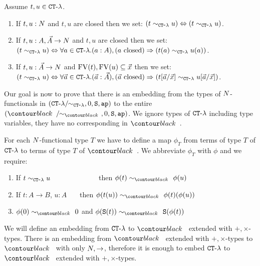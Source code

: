 \begin{definition}
Assume $t,u \in { {\tt CT} \mbox{-} \lambda}$.
\begin{enumerate}
\item
If $t,u:{N}$ and $t,u$ are closed then we set: 
$(t \sim_{{ {\tt CT} \mbox{-} \lambda}} u) \Leftrightarrow  (t \sim_{{ {\tt CT} \mbox{-} \lambda}} u)$.
\item
If $t,u:A,\vec{A}\rightarrow{N}$ and $t,u$ are closed then we set: 
$(t \sim_{{ {\tt CT} \mbox{-} \lambda}} u) \Leftrightarrow  
\forall a \in { {\tt CT} \mbox{-} \lambda}. (a:A), (\mbox{$a$ closed}) \Rightarrow (t(a) \sim_{{ {\tt CT} \mbox{-} \lambda}} u(a))$.
\item
If $t,u:\vec{A}\rightarrow{N}$ and ${{\rm FV}}(t), {{\rm FV}}(u) \subseteq \vec{x}$ then we set:
$(t \sim_{{ {\tt CT} \mbox{-} \lambda}} u) 
\Leftrightarrow  
\forall \vec{a} \in { {\tt CT} \mbox{-} \lambda}. 
(\vec{a}:\vec{A}), (\mbox{$\vec{a}$ closed})  \Rightarrow (t[\vec{a}/\vec{x}] \sim_{{ {\tt CT} \mbox{-} \lambda}} u[\vec{a}/\vec{x}])$.
\end{enumerate}
\end{definition}

Our goal is now to prove that there is an embedding from the types of ${N}$-functionals in 
$({ {\tt CT} \mbox{-} \lambda}/ \!\! \sim_{{ {\tt CT} \mbox{-} \lambda}}, 0, {\tt S}, {\tt ap})$ to the entire
$(\systemT/ \!\! \sim_{\systemT}, 0, \Succ, \ap)$.
We ignore types of ${ {\tt CT} \mbox{-} \lambda}$ including type variables, they have no corresponding in $\systemT$.

For each ${N}$-functional type $T$ we have to define a map $\phi_T$ from terms of type $T$ of ${ {\tt CT} \mbox{-} \lambda}$
to terms of type $T$ of $\systemT$. We abbreviate $\phi_T$ with $\phi$ and we require:

\begin{enumerate}
\item
If $t \sim_{{ {\tt CT} \mbox{-} \lambda}} u$ \ \ \ \ \ \ \ \ \ \ \ \ \ then $\phi(t) \sim_{\systemT} \phi(u)$

\item
If $t: A \rightarrow B$, $u:A$ \ \ \ then $\phi(t(u)) \sim_{\systemT} \phi(t)(\phi(u))$

\item
$\phi(0) \sim_{\systemT} 0$ and
$\phi(\Succ(t)) \sim_{\systemT} \Succ(\phi(t))$

\end{enumerate}

We will define an embedding from ${ {\tt CT} \mbox{-} \lambda}$ to $\systemT$ extended with $+,\times$-types.
There is an embedding from  $\systemT$ extended with $+,\times$-types to  $\systemT$ with only
${N}, \rightarrow$, therefore it is enough to embed ${ {\tt CT} \mbox{-} \lambda}$ to $\systemT$ extended with $+,\times$-types.

